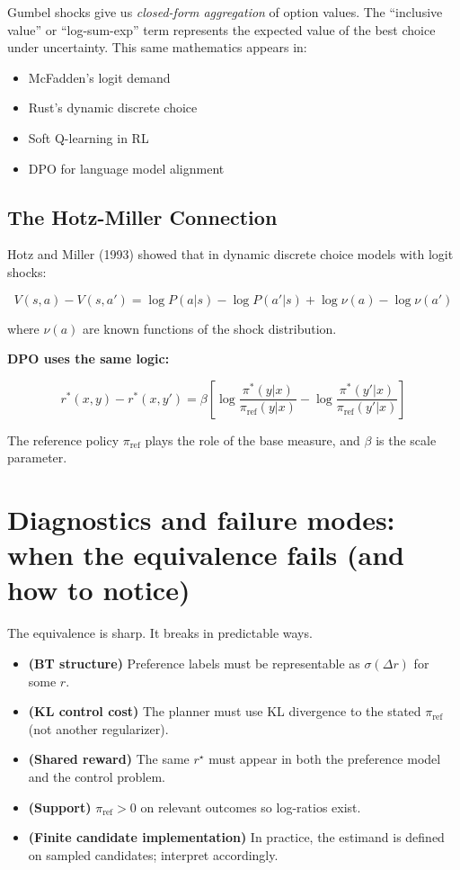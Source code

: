 \documentclass[11pt]{article}
\newcommand{\1}{\mathbf{1}}
\newcommand{\sigmoid}{\sigma}
\theoremstyle{plain}
\theoremstyle{definition}
\theoremstyle{remark}
\begin{document}
\begin{econintuition}
Gumbel shocks give us \emph{closed-form aggregation} of option values. The ``inclusive value'' or ``log-sum-exp'' term represents the expected value of the best choice under uncertainty. This same mathematics appears in:
\begin{itemize}
\item McFadden's logit demand
\item Rust's dynamic discrete choice
\item Soft Q-learning in RL
\item DPO for language model alignment
\end{itemize}
\end{econintuition}

\subsection{The Hotz-Miller Connection}

Hotz and Miller (1993) showed that in dynamic discrete choice models with logit shocks:

$$
V(s,a) - V(s,a') = \log P(a|s) - \log P(a'|s) + \log \nu(a) - \log \nu(a')
$$

where $\nu(a)$ are known functions of the shock distribution.

\textbf{DPO uses the same logic:}

$$
r^*(x,y) - r^*(x,y') = \beta \left[\log \frac{\pi^*(y|x)}{\pi_{\text{ref}}(y|x)} - \log \frac{\pi^*(y'|x)}{\pi_{\text{ref}}(y'|x)}\right]
$$

The reference policy $\pi_{\text{ref}}$ plays the role of the base measure, and $\beta$ is the scale parameter.


\section{Diagnostics and failure modes: when the equivalence fails (and how to notice)}
The equivalence is sharp. It breaks in predictable ways.

\begin{tcolorbox}[colback=light, colframe=accent, title=Checklist: what must be true for the algebra to go through]
\begin{itemize}
\item \textbf{(BT structure)} Preference labels must be representable as $\sigmoid(\Delta r)$ for some $r$.
\item \textbf{(KL control cost)} The planner must use KL divergence to the stated $\pi_{\mathrm{ref}}$ (not another regularizer).
\item \textbf{(Shared reward)} The same $r^\star$ must appear in both the preference model and the control problem.
\item \textbf{(Support)} $\pi_{\mathrm{ref}}>0$ on relevant outcomes so log-ratios exist.
\item \textbf{(Finite candidate implementation)} In practice, the estimand is defined on sampled candidates; interpret accordingly.
\end{itemize}
\end{tcolorbox}
\end{document}
